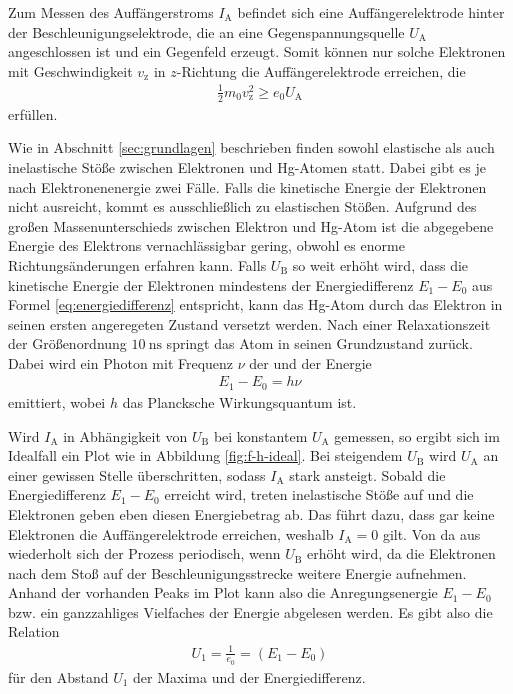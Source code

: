 \noindent
Zum Messen des Auffängerstroms $I_\text{A}$ befindet sich eine Auffängerelektrode hinter der Beschleunigungselektrode,
die an eine Gegenspannungsquelle $U_\text{A}$ angeschlossen ist und ein Gegenfeld erzeugt.
Somit können nur solche Elektronen mit Geschwindigkeit $v_\text{z}$ in $z$-Richtung die Auffängerelektrode erreichen, die 
\begin{align}
    \frac{1}{2} m_0 v^2_\text{z} \geq e_0 U_\text{A}
    \label{eq:v-kriterium}
\end{align}
erfüllen.

\noindent
Wie in Abschnitt \ref{sec:grundlagen} beschrieben finden sowohl elastische als auch inelastische Stöße zwischen Elektronen und Hg-Atomen statt.
Dabei gibt es je nach Elektronenenergie zwei Fälle.
Falls die kinetische Energie der Elektronen nicht ausreicht, kommt es ausschließlich zu elastischen Stößen.
Aufgrund des großen Massenunterschieds zwischen Elektron und Hg-Atom ist die abgegebene Energie des Elektrons vernachlässigbar gering,
obwohl es enorme Richtungsänderungen erfahren kann.
Falls $U_\text{B}$ so weit erhöht wird, 
dass die kinetische Energie der Elektronen mindestens der Energiedifferenz $E_1 - E_0$ aus Formel \eqref{eq:energiedifferenz} entspricht,
kann das Hg-Atom durch das Elektron in seinen ersten angeregeten Zustand versetzt werden.
Nach einer Relaxationszeit der Größenordnung $\qty{10}{\nano\second}$ springt das Atom in seinen Grundzustand zurück.
Dabei wird ein Photon mit Frequenz $\nu$ der und der Energie 
\begin{align}
    E_1 - E_0 = h \nu
    \label{eq:photon}
\end{align}
emittiert, wobei $h$ das Plancksche Wirkungsquantum ist.

\noindent
Wird $I_\text{A}$ in Abhängigkeit von $U_\text{B}$ bei konstantem $U_\text{A}$ gemessen, 
so ergibt sich im Idealfall ein Plot wie in Abbildung \ref{fig:f-h-ideal}.
Bei steigendem $U_\text{B}$ wird $U_\text{A}$ an einer gewissen Stelle überschritten, sodass $I_\text{A}$ stark ansteigt.
Sobald die Energiedifferenz $E_1 - E_0$ erreicht wird, treten inelastische Stöße auf und die Elektronen geben eben diesen Energiebetrag ab.
Das führt dazu, dass gar keine Elektronen die Auffängerelektrode erreichen, weshalb $I_\text{A} = 0$ gilt.
Von da aus wiederholt sich der Prozess periodisch, wenn $U_\text{B}$ erhöht wird, da die Elektronen nach dem Stoß auf der Beschleunigungsstrecke weitere Energie aufnehmen. 
Anhand der vorhanden Peaks im Plot kann also die Anregungsenergie $E_1 - E_0$ bzw. ein ganzzahliges Vielfaches der Energie abgelesen werden.
Es gibt also die Relation 
\begin{align}
    U_1 = \frac{1}{e_0} = \left(E_1 - E_0\right)
\end{align}
für den Abstand $U_1$ der Maxima und der Energiedifferenz.

